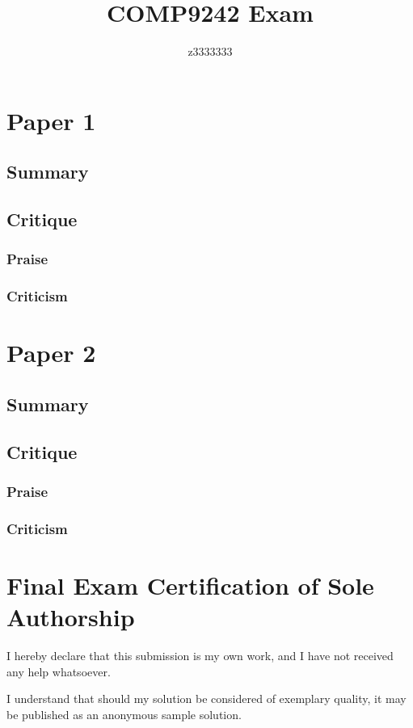 \documentclass{article}
\begin{document}
\title{COMP9242 Exam}
\author{z3333333}
\maketitle

\section{Paper 1}
\subsection{Summary}
\lipsum[2-3]
\subsection{Critique}
\subsubsection{Praise}
\lipsum[9]
\subsubsection{Criticism}
\lipsum[1]

\section{Paper 2}
\subsection{Summary}
\lipsum[2-3]
\subsection{Critique}
\subsubsection{Praise}
\lipsum[9]
\subsubsection{Criticism}
\lipsum[1]

\pagebreak
\section{Final Exam Certification of Sole Authorship}
I hereby declare that this submission is my own work, and I have not received any help whatsoever. 

\begin{table}[hbp]
\centering
{}
\end{table}

I understand that should my solution be considered of exemplary quality, it may be published as an anonymous sample solution.
\end{document}
